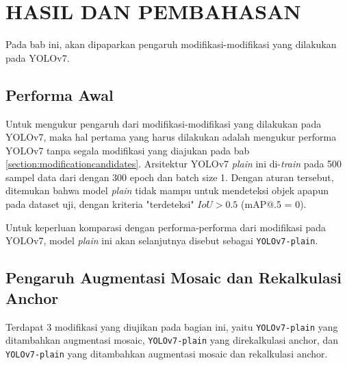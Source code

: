 \chapter{HASIL DAN PEMBAHASAN}


Pada bab ini, akan dipaparkan pengaruh modifikasi-modifikasi yang dilakukan pada YOLOv7.

\section{Performa Awal}
Untuk mengukur pengaruh dari modifikasi-modifikasi yang dilakukan pada YOLOv7, maka
hal pertama yang harus dilakukan adalah mengukur performa YOLOv7 tanpa segala modifikasi
yang diajukan pada bab \ref{section:modificationcandidates}. Arsitektur YOLOv7 \emph{plain} 
ini di-\emph{train} pada 500 sampel data dari  \textcite{aot_dataset} dengan 300 epoch dan batch size 1.
Dengan aturan tersebut, ditemukan bahwa model \emph{plain} tidak mampu untuk mendeteksi
objek apapun pada dataset uji, dengan kriteria "terdeteksi" $IoU > 0.5$ (mAP@.5 = 0).

Untuk keperluan komparasi dengan performa-performa dari modifikasi pada YOLOv7,
model \emph{plain} ini akan selanjutnya disebut sebagai \verb*|YOLOv7-plain|.

\section{Pengaruh Augmentasi Mosaic dan Rekalkulasi Anchor}


Terdapat 3 modifikasi yang diujikan pada bagian ini, yaitu \verb*|YOLOv7-plain| yang ditambahkan augmentasi mosaic,
\verb*|YOLOv7-plain| yang direkalkulasi anchor, dan \verb*|YOLOv7-plain| yang ditambahkan augmentasi mosaic dan rekalkulasi anchor.
